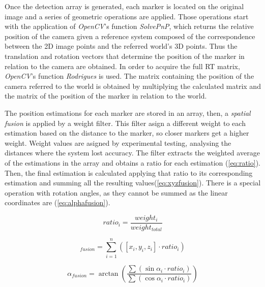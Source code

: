 \documentclass{styles/svproc}
\begin{document}
	Once the detection array is generated, each marker is located on the original image and a series of geometric operations are applied. Those operations start with the application of \textit{OpenCV}'s function \textit{SolvePnP}, which returns the relative position of the camera given a reference system composed of the correspondence between the 2D image points and the referred world's 3D points. Thus the translation and rotation vectors that determine the position of the marker in relation to the camera are obtained. In order to acquire the full RT matrix, \textit{OpenCV}'s function \textit{Rodrigues} is used. The matrix containing the position of the camera referred to the world is obtained by multiplying the calculated matrix and the matrix of the position of the marker in relation to the world.
	
	The position estimations for each marker are stored in an array, then, a \textit{spatial fusion} is applied by a weight filter. This filter asign a different weight to each estimation based on the distance to the marker, so closer markers get a higher weight. Weight values are asigned by experimental testing, analysing the distances where the system lost accuracy. The filter extracts the weighted average of the estimations in the array and obtains a ratio for each estimation (\ref{eq:ratio}). Then, the final estimation is calculated applying that ratio to its corresponding estimation and summing all the resulting values(\ref{eq:xyzfusion}). There is a special operation with rotation angles, as they cannot be summed as the linear coordinates are (\ref{eq:alphafusion}).
	
	\begin{equation}
	ratio_{i} = \frac{weight_{i}}{weight_{total}}
	\label{eq:ratio}
	\end{equation}
	
	\begin{equation}
	[x,y,z]_{fusion} = \sum_{i=1}^{n} ([x_{i},y_{i},z_{i}] \cdot ratio_{i})
	\label{eq:xyzfusion}
	\end{equation}
	
	\begin{equation}
	\alpha_{fusion} = \arctan \left( \frac{ \sum ( \sin \alpha_{i} \cdot ratio_{i} ) }{ \sum ( \cos \alpha_{i} \cdot ratio_{i} ) } \right)
	\label{eq:alphafusion}
	\end{equation}
	
	

	
\end{document}
